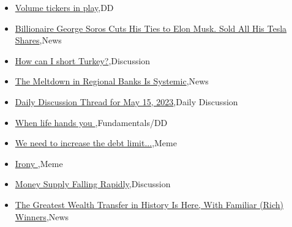 \documentclass{article}%
\begin{document}
%
\begin{itemize}%
\item%
\href{https://reddit.com/r/wallstreetbets/comments/13i6drb/volume\_tickers\_in\_play/}{Volume tickers in play},DD%
\item%
\href{https://reddit.com/r/wallstreetbets/comments/13i691q/billionaire\_george\_soros\_cuts\_his\_ties\_to\_elon/}{Billionaire George Soros Cuts His Ties to Elon Musk. Sold All His Tesla Shares},News%
\item%
\href{https://reddit.com/r/wallstreetbets/comments/13i5tj7/how\_can\_i\_short\_turkey/}{How can I short Turkey?},Discussion%
\item%
\href{https://reddit.com/r/wallstreetbets/comments/13i5bxi/the\_meltdown\_in\_regional\_banks\_is\_systemic/}{The Meltdown in Regional Banks Is Systemic},News%
\item%
\href{https://reddit.com/r/wallstreetbets/comments/13i3sop/daily\_discussion\_thread\_for\_may\_15\_2023/}{Daily Discussion Thread for May 15, 2023},Daily Discussion%
\item%
\href{https://reddit.com/r/StockMarket/comments/13i7du0/when\_life\_hands\_you/}{When life hands you },Fundamentals/DD%
\item%
\href{https://reddit.com/r/StockMarket/comments/13hulf4/we\_need\_to\_increase\_the\_debt\_limit/}{We need to increase the debt limit...},Meme%
\item%
\href{https://reddit.com/r/StockMarket/comments/13hnk2v/irony/}{Irony },Meme%
\item%
\href{https://reddit.com/r/StockMarket/comments/13h2f11/money\_supply\_falling\_rapidly/}{Money Supply Falling Rapidly},Discussion%
\item%
\href{https://reddit.com/r/Economics/comments/13hrqia/the\_greatest\_wealth\_transfer\_in\_history\_is\_here/}{The Greatest Wealth Transfer in History Is Here, With Familiar (Rich) Winners},News%
\end{itemize}%
\end{document}
